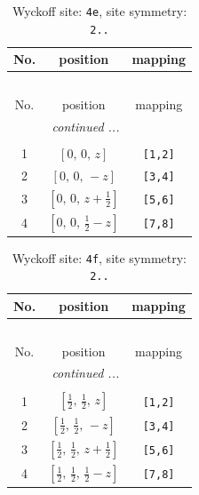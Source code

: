 \documentclass[fleqn,8pt]{jsarticle}
\begin{document}
\begin{longtable}{ccc}
\caption{Wyckoff site: {\tt 4e}, site symmetry: {\tt 2..}}
 \\
 \hline \hline
No. & position & mapping \\ \hline \endfirsthead

\multicolumn{2}{l}{\tablename\ \thetable{}} \\
 \hline \hline
No. & position & mapping \\ \hline \endhead

 \hline \hline
\multicolumn{2}{r}{\footnotesize\it continued ...} \\ \endfoot

 \hline \hline
\multicolumn{2}{r}{} \\ \endlastfoot

1 & $\left[ 0,\, 0,\, z \right]$ & {\tt [1,2]} \\ \hline
2 & $\left[ 0,\, 0,\, - z \right]$ & {\tt [3,4]} \\ \hline
3 & $\left[ 0,\, 0,\, z + \frac{1}{2} \right]$ & {\tt [5,6]} \\ \hline
4 & $\left[ 0,\, 0,\, \frac{1}{2} - z \right]$ & {\tt [7,8]} \\
\end{longtable}
\renewcommand{\arraystretch}{1.2}
\begin{longtable}{ccc}
\caption{Wyckoff site: {\tt 4f}, site symmetry: {\tt 2..}}
 \\
 \hline \hline
No. & position & mapping \\ \hline \endfirsthead

\multicolumn{2}{l}{\tablename\ \thetable{}} \\
 \hline \hline
No. & position & mapping \\ \hline \endhead

 \hline \hline
\multicolumn{2}{r}{\footnotesize\it continued ...} \\ \endfoot

 \hline \hline
\multicolumn{2}{r}{} \\ \endlastfoot

1 & $\left[ \frac{1}{2},\, \frac{1}{2},\, z \right]$ & {\tt [1,2]} \\ \hline
2 & $\left[ \frac{1}{2},\, \frac{1}{2},\, - z \right]$ & {\tt [3,4]} \\ \hline
3 & $\left[ \frac{1}{2},\, \frac{1}{2},\, z + \frac{1}{2} \right]$ & {\tt [5,6]} \\ \hline
4 & $\left[ \frac{1}{2},\, \frac{1}{2},\, \frac{1}{2} - z \right]$ & {\tt [7,8]} \\
\end{longtable}
\end{document}
